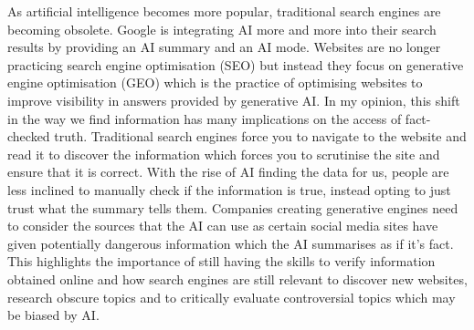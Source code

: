\documentclass[12pt,a4paper]{article}
\begin{document}
As artificial intelligence becomes more popular, traditional search engines are
becoming obsolete. Google is integrating AI more and more into their search
results by providing an AI summary and an AI mode. Websites are no longer
practicing search engine optimisation (SEO) but instead they focus on generative
engine optimisation (GEO) which is the practice of optimising websites to
improve visibility in answers provided by generative AI. In my opinion, this
shift in the way we find information has many implications on the access of
fact-checked truth. Traditional search engines force you to navigate to the
website and read it to discover the information which forces you to scrutinise
the site and ensure that it is correct. With the rise of AI finding the data for
us, people are less inclined to manually check if the information is true,
instead opting to just trust what the summary tells them. Companies creating
generative engines need to consider the sources that the AI can use as certain
social media sites have given potentially dangerous information which the AI
summarises as if it's fact. This highlights the importance of still having the
skills to verify information obtained online and how search engines are still
relevant to discover new websites, research obscure topics and to critically
evaluate controversial topics which may be biased by AI.
\end{document}
